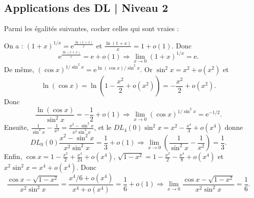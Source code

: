 \subsection{Applications des DL | Niveau 2}


\begin{question}
Parmi les égalités suivantes, cocher celles qui sont vraies :
\begin{answers} 
\end{answers}
\vskip2mm
\begin{explanations}
On a : $\displaystyle \left(1+x\right)^{1/x}=\mathrm{e}^{\frac{\ln (1+x)}{x}}$ et $\displaystyle \frac{\ln (1+x)}{x}=1+o(1)$. Donc
$$\mathrm{e}^{\frac{\ln (1+x)}{x}}=\mathrm{e}+o(1) \Rightarrow \lim _{x\to 0}\left(1+x\right)^{1/x}=\mathrm{e}.$$
De même, $\displaystyle \left(\cos x\right)^{1/\sin ^2x}=\mathrm{e}^{\ln (\cos x)/\sin ^2x}$. Or $\sin ^2x=x^2+o(x^2)$ et
$$\displaystyle \ln (\cos x)=\ln \left(1-\frac{x^2}{2}+o(x^2)\right)=-\frac{x^2}{2}+o(x^2).$$
Donc 
$$\frac{\ln (\cos x)}{\sin ^2x}=-\frac{1}{2}+o(1)\Rightarrow \lim _{x\to 0}\left(\cos x\right)^{1/\sin ^2x}=\mathrm{e}^{-1/2}.$$
Ensuite, $\displaystyle \frac{1}{\sin ^2x}-\frac{1}{x^2}=\frac{x^2-\sin ^2x}{x^2\sin ^2x}$, et le $\displaystyle DL_4(0)\sin ^2x=x^2-\frac{x^4}{3}+o(x^4)$ donne
$$DL_0(0)\frac{x^2-\sin ^2x}{x^2\sin ^2x}=\frac{1}{3}+o(1)\Rightarrow \lim _{x\to 0}\left(\frac{1}{\sin ^2x}-\frac{1}{x^2}\right)=\frac{1}{3}.$$
Enfin, $\displaystyle \cos x=1-\frac{x^2}{2}+\frac{x^4}{24}+o(x^4)$, $\displaystyle \sqrt{1-x^2}=1-\frac{x^2}{2}-\frac{x^4}{8}+o(x^4)$ et $x^2\sin ^2x=x^4+o(x^4)$. Donc
$$\frac{\cos x-\sqrt{1-x^2}}{x^2\sin ^2x}=\frac{x^4/6+o(x^4)}{x^4+o(x^4)}=\frac{1}{6}+o(1)\Rightarrow \lim _{x\to 0}\frac{\cos x-\sqrt{1-x^2}}{x^2\sin ^2x}=\frac{1}{6}.$$
\end{explanations}
\end{question}

